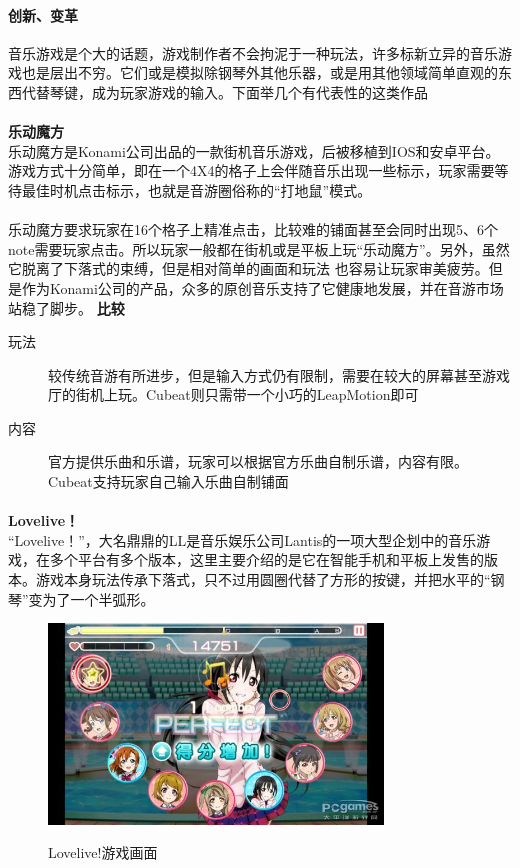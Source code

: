 \documentclass{article} \usepackage{CJK}
\begin{document}
\paragraph{创新、变革}
音乐游戏是个大的话题，游戏制作者不会拘泥于一种玩法，许多标新立异的音乐游戏也是层出不穷。它们或是模拟除钢琴外其他乐器，或是用其他领域简单直观的东西代替琴键，成为玩家游戏的输入。下面举几个有代表性的这类作品
\paragraph{}
\textbf{乐动魔方}\\
乐动魔方是Konami公司出品的一款街机音乐游戏，后被移植到IOS和安卓平台。游戏方式十分简单，即在一个4X4的格子上会伴随音乐出现一些标示，玩家需要等待最佳时机点击标示，也就是音游圈俗称的“打地鼠”模式。
\paragraph{}
乐动魔方要求玩家在16个格子上精准点击，比较难的铺面甚至会同时出现5、6个note需要玩家点击。所以玩家一般都在街机或是平板上玩“乐动魔方”。另外，虽然它脱离了下落式的束缚，但是相对简单的画面和玩法
也容易让玩家审美疲劳。但是作为Konami公司的产品，众多的原创音乐支持了它健康地发展，并在音游市场站稳了脚步。
\textbf{比较}
\begin{description}
  \item[玩法] 较传统音游有所进步，但是输入方式仍有限制，需要在较大的屏幕甚至游戏厅的街机上玩。Cubeat则只需带一个小巧的LeapMotion即可
  \item[内容] 官方提供乐曲和乐谱，玩家可以根据官方乐曲自制乐谱，内容有限。Cubeat支持玩家自己输入乐曲自制铺面
\end{description}
\paragraph{}
\textbf{Lovelive！}\\
“Lovelive！”，大名鼎鼎的LL是音乐娱乐公司Lantis的一项大型企划中的音乐游戏，在多个平台有多个版本，这里主要介绍的是它在智能手机和平板上发售的版本。游戏本身玩法传承下落式，只不过用圆圈代替了方形的按键，并把水平的“钢琴”变为了一个半弧形。
\begin{figure}
  \centering
  \includegraphics[width=24em]{ll.png}\\
  \caption{Lovelive!游戏画面}\label{3-3}
\end{figure}
\end{document}
